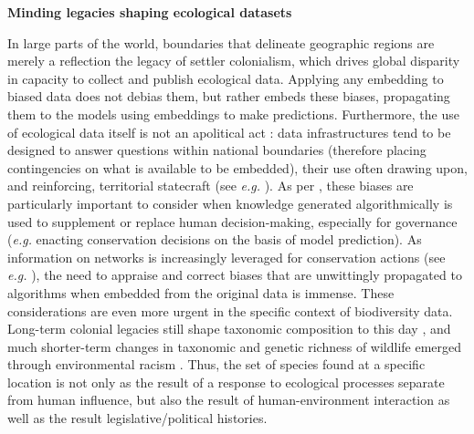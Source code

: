 \begin{summary}\label{box:people}
\textbf{Minding legacies shaping ecological datasets}

In large parts of the world, boundaries that delineate geographic
regions are merely a reflection the legacy of settler colonialism, which
drives global disparity in capacity to collect and publish ecological
data. Applying any embedding to biased data does not debias them, but
rather embeds these biases, propagating them to the models using
embeddings to make predictions. Furthermore, the use of ecological data
itself is not an apolitical act \cite{Nost2021Political}: data
infrastructures tend to be designed to answer questions within national
boundaries (therefore placing contingencies on what is available to be
embedded), their use often drawing upon, and reinforcing, territorial
statecraft (see \emph{e.g.} \cite{Barrett2005Environment}). As per
\cite{Machen2021Thinking}, these biases are particularly important to consider
when knowledge generated algorithmically is used to supplement or
replace human decision-making, especially for governance (\emph{e.g.}
enacting conservation decisions on the basis of model prediction). As
information on networks is increasingly leveraged for conservation
actions (see \emph{e.g.} \cite{Eero2021Use, Naman2022Food,
Stier2017Integrating}), the need to appraise and correct biases that
are unwittingly propagated to algorithms when embedded from the original
data is immense. These considerations are even more urgent in the
specific context of biodiversity data. Long-term colonial legacies still
shape taxonomic composition to this day \cite{Lenzner2022Naturalized,
Raja2022Colonialism}, and much shorter-term changes in taxonomic and
genetic richness of wildlife emerged through environmental racism
\cite{Schmidt2022Systemic}. Thus, the set of species found at a specific
location is not only as the result of a response to ecological processes
separate from human influence, but also the result of human-environment
interaction as well as the result legislative/political histories.
\end{summary}

